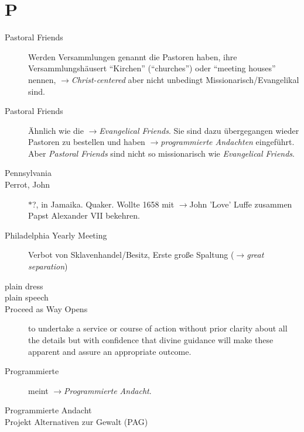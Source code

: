 \section*{P}

\articlesize

\begin{description}


 \item[Pastoral Friends] Werden Versammlungen genannt die Pastoren haben, ihre
 Versammlungshäusert "`Kirchen"' ("`churches"') oder "`meeting houses"' nennen,
 $\to$\textit{Christ-centered} aber nicht unbedingt Missionarisch/Evangelikal
 sind. 

 \item[Pastoral Friends] Ähnlich wie die $\to$\textit{Evangelical Friends}. Sie
 sind dazu übergegangen wieder Pastoren zu bestellen und haben
 $\to$\textit{programmierte Andachten} eingeführt. Aber \textit{Pastoral
 Friends} sind nicht so missionarisch wie \textit{Evangelical Friends}.


  \item[Pennsylvania]

 \item[Perrot, John] $\ast$?,  in Jamaika. Quaker. Wollte 1658 mit
 $\to$John 'Love' Luffe zusammen Papst Alexander VII bekehren.

  \item[Philadelphia Yearly Meeting] Verbot von Sklavenhandel/Besitz, Erste
  große Spaltung ($\to$\textit{great separation})


  \item[plain dress]

  \item[plain speech]

  \item[Proceed as Way Opens]
    to undertake a service or course of action without prior clarity about all the details but with confidence that divine guidance will make these apparent and assure an appropriate outcome.

 \item[Programmierte] meint $\to$\textit{Programmierte Andacht}.

 \item[Programmierte Andacht]

 \item[Projekt Alternativen zur Gewalt (PAG)]

 \end{description}
\normalsize


